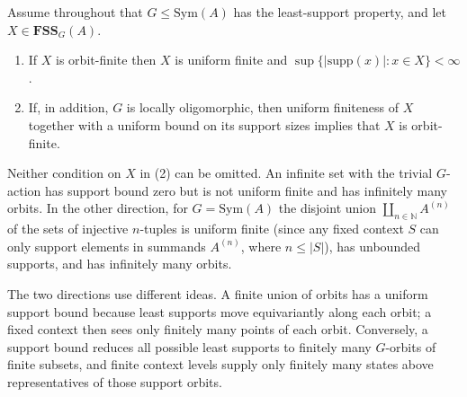 \documentclass{lmcs}
\newcommand{\Sym}{\mathrm{Sym}}
\newcommand{\supp}{\mathrm{supp}}
\newcommand{\FSS}{\mathbf{FSS}}
\begin{document}
\begin{thm}[Orbit-finiteness $=$ uniform finiteness $+$ bounded support]
\label{thm:orbitfinite}
Assume throughout that $G\leq\Sym(A)$ has the least-support property,
and let $X\in\FSS_G(A)$.
\begin{enumerate}[label=\textup{(\arabic*)}]
\item If $X$ is orbit-finite then $X$ is uniform finite and
$\sup\{|\supp(x)|:x\in X\}<\infty$.
\item If, in addition, $G$ is locally oligomorphic, then uniform
finiteness of $X$ together with a uniform bound on its support sizes
implies that $X$ is orbit-finite.
\end{enumerate}
Neither condition on $X$ in \textup{(2)} can be omitted. An infinite
set with the trivial $G$-action has support bound zero but is not
uniform finite and has infinitely many orbits. In the other direction, for $G=\Sym(A)$ the disjoint union $\coprod_{n\in\mathbb N}A^{(n)}$ of the sets of injective $n$-tuples is uniform finite (since any fixed context $S$ can only support elements in summands $A^{(n)}$, where $n\leq |S|$), has unbounded supports, and has infinitely many orbits.
\end{thm}

The two directions use different ideas. A finite union of orbits has a
uniform support bound because least supports move equivariantly along each
orbit; a fixed context then sees only finitely many points of each orbit.
Conversely, a support bound reduces all possible least supports to finitely
many $G$-orbits of finite subsets, and finite context levels supply only
finitely many states above representatives of those support orbits.
\end{document}

